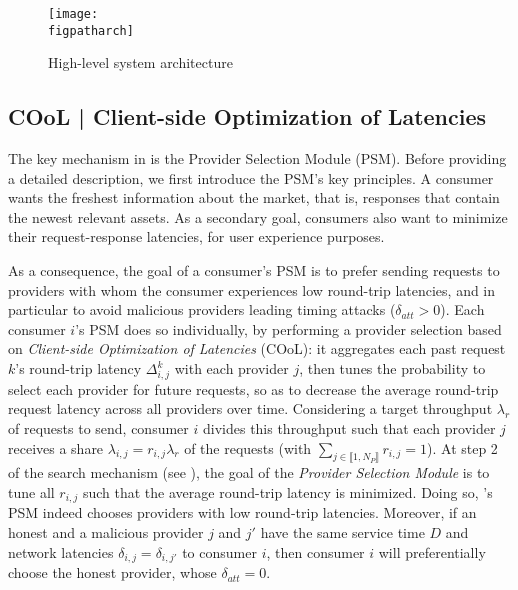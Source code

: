 \begin{figure}
    \centering
    \texttt{[image: \\figpatharch]}
    \caption{High-level system architecture}\vspace{-0.5cm}
    \label{fig:system_arch}
\end{figure}

\subsection{COoL | Client-side Optimization of Latencies}\label{subsec:cool}

The key mechanism in \sysname is the Provider Selection Module (PSM). 
Before providing a detailed description, we first introduce the PSM's key principles.
A consumer wants the freshest information about the market, that is, responses that contain the newest relevant assets.
As a secondary goal, consumers also want to minimize their request-response latencies, for user experience purposes.

As a consequence, the goal of a consumer's PSM is to prefer sending requests to providers with whom the consumer experiences low round-trip latencies, and in particular to avoid malicious providers leading timing attacks ($\delta_{att}>0$). 
Each consumer $i$'s PSM does so individually, by performing a provider selection based on \emph{Client-side Optimization of Latencies} (COoL): 
it aggregates each past request $k$'s round-trip latency $\Delta^{k}_{i,j}$ with each provider $j$, then tunes the probability to select each provider for future requests, so as to decrease the average round-trip request latency across all providers over time.
Considering a target throughput $\lambda_{r}$ of requests to send, consumer $i$ divides this throughput such that each provider $j$ receives a share $\lambda_{i,j}=r_{i,j}\lambda_{r}$ of the requests (with $\sum_{j\in \llbracket 1,N_{P}\rrbracket}r_{i,j}=1$).
At step 2 of the search mechanism (see ), the goal of the \emph{Provider Selection Module} is to tune all $r_{i,j}$ such that the average round-trip latency is minimized.
Doing so, \sysname's PSM indeed chooses providers with low round-trip latencies. 
Moreover, if an honest and a malicious provider $j$ and $j'$ have the same service time $D$ and network latencies $\delta_{i,j}=\delta_{i,j'}$ to consumer $i$, then consumer $i$ will preferentially choose the honest provider, whose $\delta_{att}=0$.
